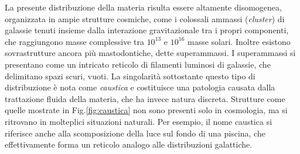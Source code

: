 La presente distribuzione della materia risulta essere altamente disomogenea, organizzata in ampie strutture 
cosmiche, come i colossali ammassi (\textit{cluster}) di galassie tenuti insieme dalla
interazione gravitazionale tra i propri componenti, che raggiungono masse complessive tra $10^{13}$
e $10^{16}$ masse solari. Inoltre esistono sovrastrutture ancora più mastodontiche, dette superammassi.
I superammassi si presentano come un intricato reticolo di filamenti luminosi di galassie, che delimitano
spazi scuri, vuoti. La singolarità sottostante questo tipo di distribuzione è nota come \textit{caustica} e costituisce una 
patologia causata dalla trattazione fluida della materia, che ha invece natura discreta.
Strutture come quelle mostrate in Fig.\ref{fig:caustica} non sono presenti solo in cosmologia, ma 
si ritrovano in molteplici situazioni naturali. Per esempio, il nome caustica si riferisce anche alla scomposizione
della luce sul fondo di una piscina, che effettivamente forma un reticolo analogo alle distribuzioni galattiche.

